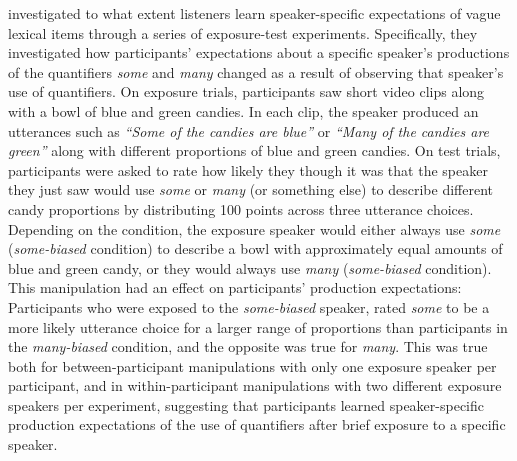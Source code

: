 \cite{Yildirim2016} investigated to what extent listeners learn speaker-specific expectations of vague lexical items through a series of exposure-test experiments.
Specifically, they investigated how participants' expectations about a specific speaker's productions of the quantifiers \textit{some} and \textit{many} changed
as a result of observing that speaker's use of quantifiers. On exposure trials, participants saw short video clips along with a bowl of blue and green candies.
In each clip, the speaker produced an utterances such as \textit{``Some of the candies are blue''} or \textit{``Many of the candies are green''} along with different proportions
of blue and green candies. On test trials, participants were asked to rate how likely they though it was that the speaker they just saw would use \textit{some} or \textit{many} (or something else)
to describe different candy proportions by distributing 100 points across three utterance choices. 
Depending on the condition, the exposure speaker would either always use \textit{some} (\textit{some-biased} condition)  to describe a bowl with approximately 
equal amounts of blue and green candy, or they would always use \textit{many}  (\textit{some-biased} condition). This manipulation had an effect on participants' production
expectations: Participants who were exposed to the \textit{some-biased} speaker, rated \textit{some} to be a more likely utterance choice for a larger range of proportions than
participants in the \textit{many-biased} condition, and the opposite was true for \textit{many}. This was true both for between-participant manipulations with only one exposure speaker per participant,
 and in within-participant manipulations with two different exposure speakers per experiment, suggesting that participants learned speaker-specific production expectations of the use of quantifiers after
 brief exposure to a specific speaker.


